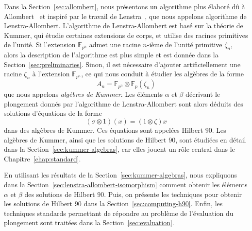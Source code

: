 Dans la Section~\ref{sec:allombert}, nous présentons un algorithme plus élaboré
dû à Allombert~\cite{Allombert02} et inspiré par le travail de
Lenstra~\cite{Lenstra91}, que nous appelons algorithme de Lenstra-Allombert.
L'algorithme de Lenstra-Allombert est basé sur la théorie de Kummer, qui étudie
certaines extensions de corps, et utilise des racines primitives de l'unité. Si
l'extension $\mathbb{F}_{p^{n}}$ admet une racine $n$-ième de l'unité primitive
$\zeta_n$,
alors la description de l'algorithme est plus simple et est donnée dans la
Section~\ref{sec:preliminaries}. Sinon, il est nécessaire d'ajouter
artificiellement une racine $\zeta_n$ à l'extension $\mathbb{F}_{p^{n}}$, ce qui
nous conduit à étudier les algèbres de la forme
\[
  A_n = \mathbb{F}_{p^{n}}\otimes\mathbb{F}_p(\zeta_n)
\]
que nous appelons \emph{algèbres de Kummer}. Les éléments $\alpha$ et $\beta$
décrivant le plongement donnés par l'algorithme de Lenstra-Allombert sont alors
déduits des solutions d'équations de la forme
\[
  (\sigma\otimes1)(x) = (1\otimes\zeta)x
\]
dans des algèbres de Kummer. Ces équations sont appelées Hilbert $90$. Les
algèbres de Kummer, ainsi que les solutions de Hilbert $90$, sont étudiées en
détail dans la Section~\ref{sec:kummer-algebras}, car elles jouent un rôle
central dans le Chapitre~\ref{chap:standard}.

En utilisant les résultats de la Section~\ref{sec:kummer-algebras}, nous
expliquons dans la Section~\ref{sec:lenstra-allombert-isomorphism} comment
obtenir les éléments $\alpha$ et $\beta$ des solutions de Hilbert $90$. Puis,
on présente les techniques pour obtenir les solutions de Hilbert $90$ dans la
Section~\ref{sec:computing-h90}. Enfin, les techniques standards permettant de
répondre au problème de l'évaluation du plongement sont traitées dans la
Section~\ref{sec:evaluation}.

